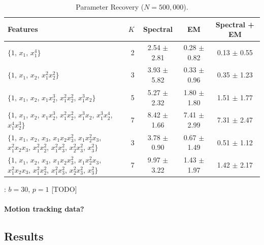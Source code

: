 \begin{table}[t]
\caption{Parameter Recovery ($N = 500,000$).}
\label{tbl:parameter-recovery}
\vskip 0.15in
\begin{center}
\begin{small}
\begin{sc}

  \begin{tabular}{ >{\centering}p{5cm}<{\centering} r c c c }
\hline
\abovespace\belowspace
Features  & $K$ & Spectral & EM & Spectral + EM \\
\hline
\abovespace
$\{1$, $ x_1$, $ x_1^4\}$ 
  & 2 & 2.54 $\pm$ 2.81 & 0.28 $\pm$ 0.82 & 0.13 $\pm$ 0.55 \\
$\{1$, $ x_1$, $ x_2$, $ x_1^2 x_2^2\}$ 
  & 3 & 3.93 $\pm$ 5.82 & 0.33 $\pm$ 0.96 & 0.35 $\pm$ 1.23 \\
$\{1$, $ x_1$, $ x_2$, $ x_1 x_2^3$, $ x_1^2 x_2^2$, $ x_1^3 x_2 \}$ 
  & 5 & 5.27 $\pm$ 2.32 & 1.80 $\pm$ 1.80 & 1.51 $\pm$ 1.77 \\
$\{1$, $ x_1$, $ x_2$, $ x_1 x_2^3$, $ x_1^2 x_2^2$, $ x_1^3 x_2$, $ x_1^3 x_2^4$, $ x_1^4 x_2^3 \}$ 
  & 7 & 8.42 $\pm$ 1.66 & 7.41 $\pm$ 2.99 & 7.31 $\pm$ 2.47 \\
$\{1$, $ x_1$, $ x_2$, $ x_3$, $ x_1 x_2 x_3^2$, $ x_1 x_2^2 x_3$, $ x_1^2 x_2 x_3$, $ x_1^2 x_2^2$, $ x_1^2 x_3^2$, $ x_2^2 x_3^2$, $ x_3^2\}$
  & 3 & 3.78 $\pm$ 0.90 & 0.67 $\pm$ 1.49 & 0.51 $\pm$ 1.12 \\
$\{1$, $ x_1$, $ x_2$, $ x_3$, $ x_1 x_2 x_3^2$, $ x_1 x_2^2 x_3$, $ x_1^2 x_2 x_3$, $ x_1^2 x_2^2$, $ x_1^2 x_3^2$, $ x_2^2 x_3^2$, $ x_3^2\}$
  & 7 & 9.97 $\pm$ 3.22 & 1.43 $\pm$ 1.97 & 1.42 $\pm$ 2.17 \\
\hline
\end{tabular}
\end{sc}
\end{small}
\end{center}
\vskip -0.1in
\end{table}

: $b = 30$, $p = 1$ [TODO]



\paragraph{Motion tracking data?}

\subsection{Results}

